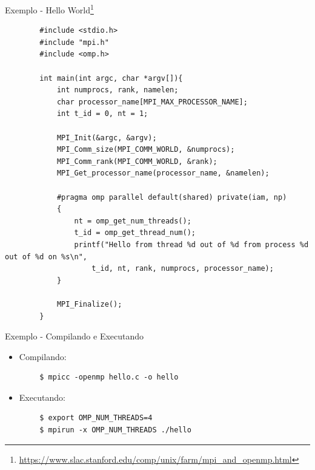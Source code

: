 \begin{frame}[fragile]{Exemplo - Hello World\footnote{\url{https://www.slac.stanford.edu/comp/unix/farm/mpi_and_openmp.html}}}
	\begin{verbatim}
		#include <stdio.h>
		#include "mpi.h"
		#include <omp.h>
		
		int main(int argc, char *argv[]){
			int numprocs, rank, namelen;
			char processor_name[MPI_MAX_PROCESSOR_NAME];
			int t_id = 0, nt = 1;
			
			MPI_Init(&argc, &argv);
			MPI_Comm_size(MPI_COMM_WORLD, &numprocs);
			MPI_Comm_rank(MPI_COMM_WORLD, &rank);
			MPI_Get_processor_name(processor_name, &namelen);
			
			#pragma omp parallel default(shared) private(iam, np)
			{
				nt = omp_get_num_threads();
				t_id = omp_get_thread_num();
				printf("Hello from thread %d out of %d from process %d out of %d on %s\n",
					t_id, nt, rank, numprocs, processor_name);
			}
			
			MPI_Finalize();
		}
	\end{verbatim}
\end{frame}

\begin{frame}[fragile]{Exemplo - Compilando e Executando}
	\begin{itemize}
		\item Compilando:
	\end{itemize}
	\begin{verbatim}
		$ mpicc -openmp hello.c -o hello
	\end{verbatim}
	\begin{itemize}
		\item Executando:
	\end{itemize}
	\begin{verbatim}
		$ export OMP_NUM_THREADS=4
		$ mpirun -x OMP_NUM_THREADS ./hello
	\end{verbatim}
\end{frame}


